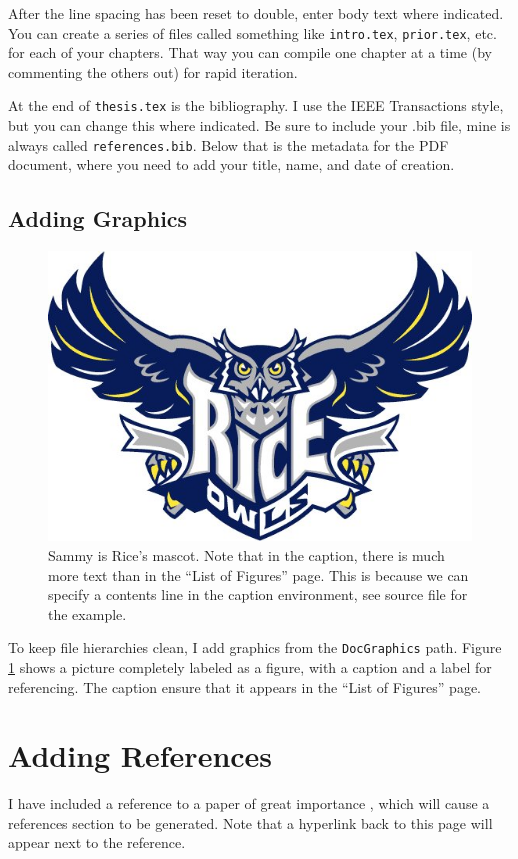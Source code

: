 After the line spacing has been reset to double, enter body text where indicated.  You can create a series of files called something like \verb+intro.tex+, \verb+prior.tex+, etc. for each of your chapters.  That way you can compile one chapter at a time (by commenting the others out) for rapid iteration.

At the end of \verb+thesis.tex+ is the bibliography.  I use the IEEE Transactions style, but you can change this where indicated.  Be sure to include your .bib file, mine is always called \verb+references.bib+.  Below that is the metadata for the PDF document, where you need to add your title, name, and date of creation.

\subsection{Adding Graphics}

\begin{figure}
	\center
	\includegraphics [width=.3\textwidth] {./DocGraphics/sammy.jpg}
	\caption[Go Owls]{Sammy is Rice's mascot.  Note that in the caption, there is much more text than in the ``List of Figures'' page.  This is because we can specify a contents line in the caption environment, see source file for the example.}
	\label{fig:ricelogo}
\end{figure}

To keep file hierarchies clean, I add graphics from the \verb+DocGraphics+ path.  Figure \ref{fig:ricelogo} shows a picture completely labeled as a figure, with a caption and a label for referencing.  The caption ensure that it appears in the ``List of Figures'' page.

\section{Adding References}

I have included a reference to a paper of great importance \cite{Zelst:GreatMeaning}, which will cause a references section to be generated.  Note that a hyperlink back to this page will appear next to the reference.

% 
